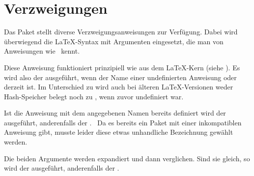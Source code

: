 \section{Verzweigungen}

Das Paket  stellt diverse Verzweigungsanweisungen zur
Verfügung. Dabei wird überwiegend die \LaTeX-Syntax mit Argumenten eingesetzt,
die man von Anweisungen wie \iffalse %
, \Macro{@ifundefined}, \Macro{@ifpackageloaded} und vielen weiteren\fi %
\ kennt.

\begin{Declaration}
\end{Declaration}
Diese Anweisung funktioniert
prinzipiell wie  aus dem \LaTeX-Kern (siehe
\cite{latex:source2e}). Es wird also der  ausgeführt, wenn
 der Name einer undefinierten Anweisung oder 
derzeit  ist. Im Unterschied zu  wird auch
bei älteren \LaTeX-Versionen %
\iftrue%
weder Hash-Speicher belegt noch  %
\else%
\Macro{\PName{Name}} nicht %
\fi%
zu , wenn  zuvor undefiniert
war.
\EndIndexGroup


\begin{Declaration}
\end{Declaration}
Ist die Anweisung mit dem angegebenen
Namen bereits definiert wird der  ausgeführt, anderenfalls
der .\iftrue %
\ Da es bereits ein Paket mit einer inkompatiblen
Anweisung  gibt, musste leider diese etwas unhandliche
Bezeichnung gewählt werden.%
\iffalse%
\iftrue%
\ Von dieser Anweisung gibt es keine interne Variante.%
\else%
\ Es gibt keine interne Variante.%
\fi%
\fi%
\fi%
\EndIndexGroup


\begin{Declaration}
\end{Declaration}
Die beiden Argumente 
werden expandiert und dann verglichen. Sind sie gleich, so wird der
 ausgeführt, anderenfalls der .%
\iffalse%
\iftrue%
\ Von dieser Anweisung gibt es keine interne Variante.%
\else%
\ Es gibt keine interne Variante.%
\fi%
\fi%
\EndIndexGroup


